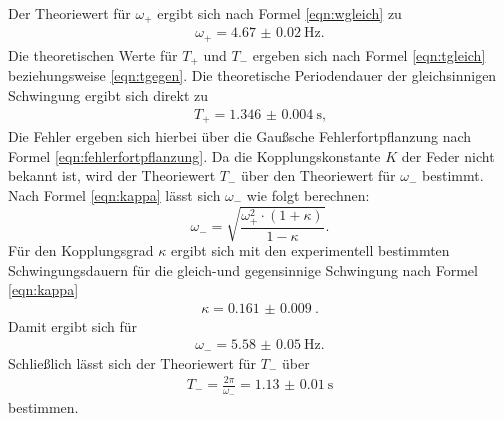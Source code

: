 Der Theoriewert für $\omega_{\mathrm{+}}$ ergibt sich nach Formel \eqref{eqn:wgleich} zu
\begin{align*}
	\omega_{\mathrm{+}}= \SI{4.67(2)}{\Hz} \text{.}
\end{align*}
Die theoretischen Werte für $T_{\mathrm{+}}$ und $T_{\mathrm{-}}$ ergeben sich nach Formel \eqref{eqn:tgleich} beziehungsweise \eqref{eqn:tgegen}.
Die theoretische Periodendauer der gleichsinnigen Schwingung ergibt sich direkt zu
\begin{gather*}
	T_{\mathrm{+}}=\SI{1.346(4)}{\second} \text{,}
\end{gather*}
Die Fehler ergeben sich hierbei über die Gaußsche Fehlerfortpflanzung nach Formel \eqref{eqn:fehlerfortpflanzung}.
Da die Kopplungskonstante $K$ der Feder nicht bekannt ist, wird der Theoriewert $T_{\mathrm{-}}$ über den Theoriewert für $\omega_{\mathrm{-}}$ bestimmt.
Nach Formel \eqref{eqn:kappa} lässt sich $\omega_{\mathrm{-}}$ wie folgt berechnen:
\begin{equation}
	\label{eqn:omegaminus}
	\omega_{\mathrm{-}}=\sqrt{\frac{\omega_{\mathrm{+}}^2 \cdot(1+\kappa)}{1-\kappa}} \text{.}
\end{equation}
Für den Kopplungsgrad $\kappa$ ergibt sich mit den experimentell bestimmten Schwingungsdauern für die gleich-und gegensinnige Schwingung nach Formel \eqref{eqn:kappa}
\begin{align*}
	\kappa=\SI{0.161(9)}{} \text{.}
\end{align*}
Damit ergibt sich für
\begin{align*}
	\omega_{\mathrm{-}}=\SI{5.58(5)}{\Hz} \text{.}
\end{align*}
Schließlich lässt sich der Theoriewert für $T_{\mathrm{-}}$ über
\begin{align*}
	T_{\mathrm{-}}=\frac{2\pi}{\omega_{\mathrm{-}}}=\SI{1.13(1)}{\second}
\end{align*}
bestimmen.

